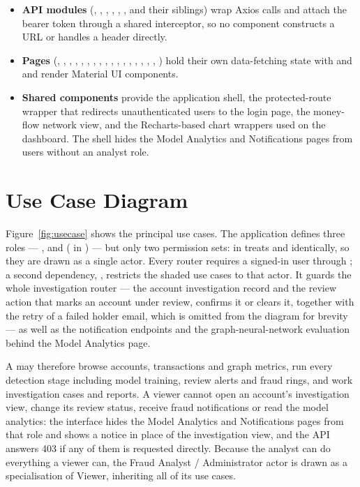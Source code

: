 \begin{itemize}
  \item \textbf{API modules} (, , , , , ,  and their siblings) wrap Axios calls and attach the bearer token through a shared interceptor, so no component constructs a URL or handles a header directly.
  \item \textbf{Pages} (, , , , , , , , , , , , , , , , , ) hold their own data-fetching state with  and  and render Material UI components.
  \item \textbf{Shared components} provide the application shell, the protected-route wrapper that redirects unauthenticated users to the login page, the money-flow network view, and the Recharts-based chart wrappers used on the dashboard. The shell hides the Model Analytics and Notifications pages from users without an analyst role.
\end{itemize}

\section{Use Case Diagram}\label{sec:usecase}
Figure~\ref{fig:usecase} shows the principal use cases. The application defines three roles --- ,  and  ( in ) --- but only two permission sets:  in  treats  and  identically, so they are drawn as a single actor. Every router requires a signed-in user through ; a second dependency, , restricts the shaded use cases to that actor. It guards the whole investigation router --- the account investigation record and the review action that marks an account under review, confirms it or clears it, together with the retry of a failed holder email, which is omitted from the diagram for brevity --- as well as the notification endpoints and the graph-neural-network evaluation behind the Model Analytics page.

A  may therefore browse accounts, transactions and graph metrics, run every detection stage including model training, review alerts and fraud rings, and work investigation cases and reports. A viewer cannot open an account's investigation view, change its review status, receive fraud notifications or read the model analytics: the interface hides the Model Analytics and Notifications pages from that role and shows a notice in place of the investigation view, and the API answers 403 if any of them is requested directly. Because the analyst can do everything a viewer can, the Fraud Analyst / Administrator actor is drawn as a specialisation of Viewer, inheriting all of its use cases.

